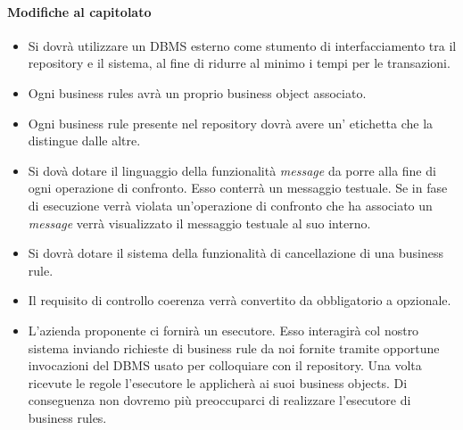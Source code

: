 \documentclass[11pt,titlepage,a4paper]{report}
\begin{document}
\paragraph{Modifiche al capitolato}

\begin{itemize}

\item Si dovr\`a utilizzare un DBMS esterno come stumento di interfacciamento tra il repository e il sistema, al fine di ridurre al minimo i tempi per le transazioni.

\item Ogni business rules avr\`a un proprio business object associato.

\item Ogni business rule presente nel repository dovr\`a avere un' etichetta che la distingue dalle altre.

\item Si dov\`a dotare il linguaggio della funzionalit\`a \textit{message} da porre alla fine di ogni operazione di confronto. Esso conterr\`a un messaggio testuale. Se in fase di esecuzione verr\`a violata un'operazione di confronto che ha associato un \textit{message} verr\`a visualizzato il messaggio testuale al suo interno.

\item Si dovr\`a dotare il sistema della funzionalit\`a di cancellazione di una business rule.

\item Il requisito di controllo coerenza verr\`a convertito da obbligatorio a opzionale.

\item L'azienda proponente ci fornir\`a un esecutore. Esso interagir\`a col nostro sistema inviando richieste di business rule da noi fornite tramite opportune invocazioni del DBMS usato per colloquiare con il repository. Una volta ricevute le regole l'esecutore le applicher\`a ai suoi business objects. Di conseguenza non dovremo pi\`u preoccuparci di realizzare l'esecutore di business rules.
\end{itemize}
\end{document}
